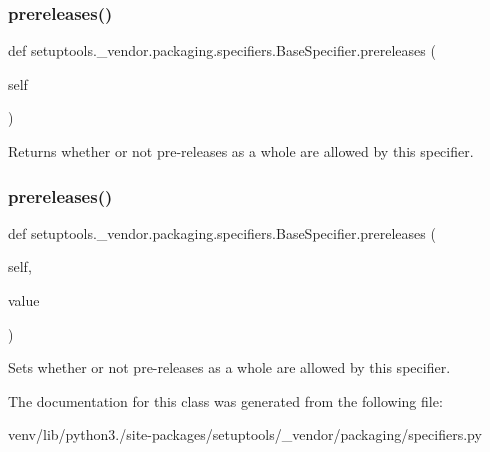 \subsubsection{\texorpdfstring{prereleases()}{prereleases()}\hspace{0.1cm}{\footnotesize\ttfamily [1/2]}}
{\footnotesize\ttfamily def setuptools.\+\_\+vendor.\+packaging.\+specifiers.\+Base\+Specifier.\+prereleases (\begin{DoxyParamCaption}\item[{}]{self }\end{DoxyParamCaption})}

\begin{DoxyVerb}Returns whether or not pre-releases as a whole are allowed by this
specifier.
\end{DoxyVerb}
 \mbox{\label{classsetuptools_1_1__vendor_1_1packaging_1_1specifiers_1_1_base_specifier_a277ac572376967bf297c113bb9fc14ee}} 
\subsubsection{\texorpdfstring{prereleases()}{prereleases()}\hspace{0.1cm}{\footnotesize\ttfamily [2/2]}}
{\footnotesize\ttfamily def setuptools.\+\_\+vendor.\+packaging.\+specifiers.\+Base\+Specifier.\+prereleases (\begin{DoxyParamCaption}\item[{}]{self,  }\item[{}]{value }\end{DoxyParamCaption})}

\begin{DoxyVerb}Sets whether or not pre-releases as a whole are allowed by this
specifier.
\end{DoxyVerb}
 

The documentation for this class was generated from the following file\+:\begin{DoxyCompactItemize}
\item 
venv/lib/python3./site-\/packages/setuptools/\+\_\+vendor/packaging/specifiers.\+py\end{DoxyCompactItemize}
